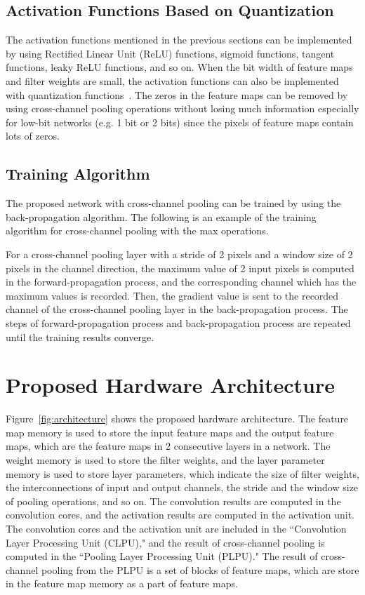 \documentclass[10pt,twocolumn,letterpaper]{article}
\begin{document}
\subsection{Activation Functions Based on Quantization}

The activation functions mentioned in the previous sections can be implemented by using Rectified Linear Unit (ReLU) functions, sigmoid functions, tangent functions, leaky ReLU functions, and so on. When the bit width of feature maps and filter weights are small, the activation functions can also be implemented with quantization functions~\cite{Zhou16,Cai17}. The zeros in the feature maps can be removed by using cross-channel pooling operations without losing much information especially for low-bit networks (e.g. 1 bit or 2 bits) since the pixels of feature maps contain lots of zeros.

\subsection{Training Algorithm}
\label{subsec:training}

The proposed network with cross-channel pooling can be trained by using the back-propagation algorithm. The following is an example of the training algorithm for cross-channel pooling with the max operations.

For a cross-channel pooling layer with a stride of 2 pixels and a window size of 2 pixels in the channel direction, the maximum value of 2 input pixels is computed in the forward-propagation process, and the corresponding channel which has the maximum values is recorded. Then, the gradient value is sent to the recorded channel of the cross-channel pooling layer in the back-propagation process. The steps of forward-propagation process and back-propagation process are repeated until the training results converge.



\section{Proposed Hardware Architecture}
\label{sec:architecture}

Figure~\ref{fig:architecture} shows the proposed hardware architecture. The feature map memory is used to store the input feature maps and the output feature maps, which are the feature maps in 2 consecutive layers in a network. The weight memory is used to store the filter weights, and the layer parameter memory is used to store layer parameters, which indicate the size of filter weights, the interconnections of input and output channels, the stride and the window size of pooling operations, and so on. The convolution results are computed in the convolution cores, and the activation results are computed in the activation unit. The convolution cores and the activation unit are included in the ``Convolution Layer Processing Unit (CLPU)," and the result of cross-channel pooling is computed in the ``Pooling Layer Processing Unit (PLPU)." The result of cross-channel pooling from the PLPU is a set of blocks of feature maps, which are store in the feature map memory as a part of feature maps.
\end{document}
